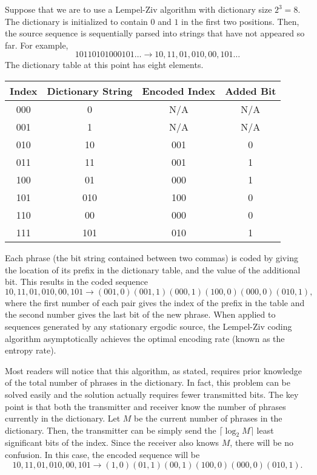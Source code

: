 \begin{example}
Suppose that we are to use a Lempel-Ziv algorithm with dictionary size $2^3 = 8$.
The dictionary is initialized to contain $0$ and $1$ in the first two positions.
Then, the source sequence is sequentially parsed into strings that have not appeared so far.
For example, 
\begin{equation*}
10110101000101 \ldots \rightarrow 10,11,01,010,00,101 \ldots
\end{equation*}
The dictionary table at this point has eight elements.

\begin{center}
\begin{tabular}{|c|c|c|c|}
\hline
Index & Dictionary String & Encoded Index & Added Bit \\
\hline
000 & 0 & N/A & N/A \\
001 & 1 & N/A & N/A \\
010 & 10 & 001 & 0 \\
011 & 11 & 001 & 1 \\
100 & 01 & 000 & 1 \\
101 & 010 & 100 & 0 \\
110 & 00 & 000 & 0 \\
111 & 101 & 010 & 1 \\
\hline
\end{tabular}
\end{center}

Each phrase (the bit string contained between two commas) is coded by giving the location of its prefix in the dictionary table, and the value of the additional bit.
This results in the coded sequence
\begin{equation*}
10,11,01,010,00,101 \rightarrow (001, 0)(001, 1)(000, 1)(100, 0)(000, 0)(010, 1),
\end{equation*}
where the first number of each pair gives the index of the prefix in the table and the second number gives the last bit of the new phrase. 
When applied to sequences generated by any stationary ergodic source, the Lempel-Ziv coding algorithm asymptotically achieves the optimal encoding rate (known as the entropy rate).
\end{example}

Most readers will notice that this algorithm, as stated, requires prior knowledge of the total number of phrases in the dictionary.
In fact, this problem can be solved easily and the solution actually requires fewer transmitted bits.
The key point is that both the transmitter and receiver know the number of phrases currently in the dictionary.
Let $M$ be the current number of phrases in the dictionary.
Then, the transmitter can be simply send the $\lceil \log_2 M \rceil$ least significant bits of the index.
Since the receiver also knows $M$, there will be no confusion.
In this case, the encoded sequence will be
\begin{equation*}
10,11,01,010,00,101 \rightarrow (1, 0)(01, 1)(00, 1)(100, 0)(000, 0)(010, 1).
\end{equation*}


